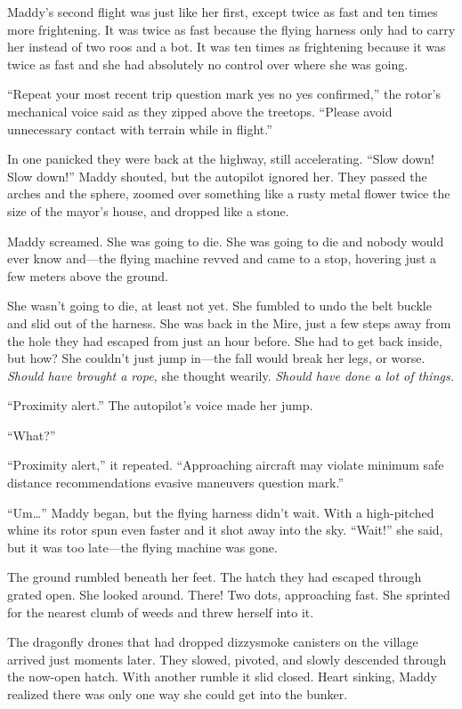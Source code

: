 \documentclass[10pt]{article}
\begin{document}
Maddy's second flight was just like her first, except twice as fast and
ten times more frightening. It was twice as fast because the flying
harness only had to carry her instead of two roos and a bot. It was ten
times as frightening because it was twice as fast and she had absolutely
no control over where she was going.

``Repeat your most recent trip question mark yes no yes confirmed,'' the
rotor's mechanical voice said as they zipped above the treetops.
``Please avoid unnecessary contact with terrain while in flight.''

In one panicked they were back at the highway, still accelerating.
``Slow down! Slow down!'' Maddy shouted, but the autopilot ignored her.
They passed the arches and the sphere, zoomed over something like a
rusty metal flower twice the size of the mayor's house, and dropped like
a stone.

Maddy screamed. She was going to die. She was going to die and nobody
would ever know and---the flying machine revved and came to a stop,
hovering just a few meters above the ground.

She wasn't going to die, at least not yet. She fumbled to undo the belt
buckle and slid out of the harness. She was back in the Mire, just a few
steps away from the hole they had escaped from just an hour before. She
had to get back inside, but how? She couldn't just jump in---the fall
would break her legs, or worse. \emph{Should have brought a rope,} she
thought wearily. \emph{Should have done a lot of things.}

``Proximity alert.'' The autopilot's voice made her jump.

``What?''

``Proximity alert,'' it repeated. ``Approaching aircraft may violate
minimum safe distance recommendations evasive maneuvers question mark.''

``Um\ldots{}'' Maddy began, but the flying harness didn't wait. With a
high-pitched whine its rotor spun even faster and it shot away into the
sky. ``Wait!'' she said, but it was too late---the flying machine was
gone.

The ground rumbled beneath her feet. The hatch they had escaped through
grated open. She looked around. There! Two dots, approaching fast. She
sprinted for the nearest clumb of weeds and threw herself into it.

The dragonfly drones that had dropped dizzysmoke canisters on the
village arrived just moments later. They slowed, pivoted, and slowly
descended through the now-open hatch. With another rumble it slid
closed. Heart sinking, Maddy realized there was only one way she could
get into the bunker.
\end{document}
